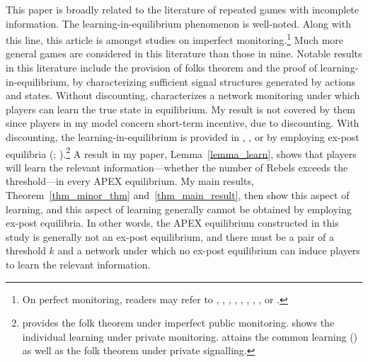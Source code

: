 \documentclass[12pt,letter]{article}
\theoremstyle{definition}
\theoremstyle{remark}
\theoremstyle{claim}
\begin{document}
This paper is broadly related to the literature of repeated games with incomplete information. The learning-in-equilibrium phenomenon is well-noted. Along with this line, this article is amongst studies on imperfect monitoring.\footnote{On perfect monitoring, readers may refer to \citep{FORGES1992155}, \citep{Hart1985}, \citep{Aumann1995}, \citep{Jordan1995}, \citep{Cripps2003}, \citep{GOSSNER2003}, \citep{Horner2009}, \citep{Horner2011}, or \citep{Wiseman2012}.}
Much more general games are considered in this literature than those in mine. Notable results in this literature include the provision of folks theorem and the proof of learning-in-equilibrium, by characterizing sufficient signal structures generated by actions and states. Without discounting, \citep{RENAULT2004124} characterizes a network monitoring under which players can learn the true state in equilibrium. My result is not covered by them since players in my model concern short-term incentive, due to discounting. With discounting, the learning-in-equilibrium is provided in \citep{Fudenberg2011}, \citep{Yamamoto2014}, or \citep{Sugaya2018} by employing ex-post equilibria (\citep{Horner2009}; \citep{Horner2011}).\footnote{\citep{Fudenberg2011} provides the folk theorem under imperfect public monitoring. \citep{Yamamoto2014} shows the individual learning under private monitoring. \citep{Sugaya2018} attains the common learning (\citep{Cripps2008}) as well as the folk theorem under private signalling.}
A result in my paper, Lemma~\ref{lemma_learn}, shows that players will learn the relevant information---whether the number of Rebels exceeds the threshold---in every APEX equilibrium. My main results, Theorem~\ref{thm_minor_thm} and~\ref{thm_main_result}, then show this aspect of learning, and this aspect of learning generally cannot be obtained by employing ex-post equilibria. In other words, the APEX equilibrium constructed in this study is generally not an ex-post equilibrium, and there must be a pair of a threshold $k$ and a network under which no ex-post equilibrium can induce players to learn the relevant information.



 
\end{document}
